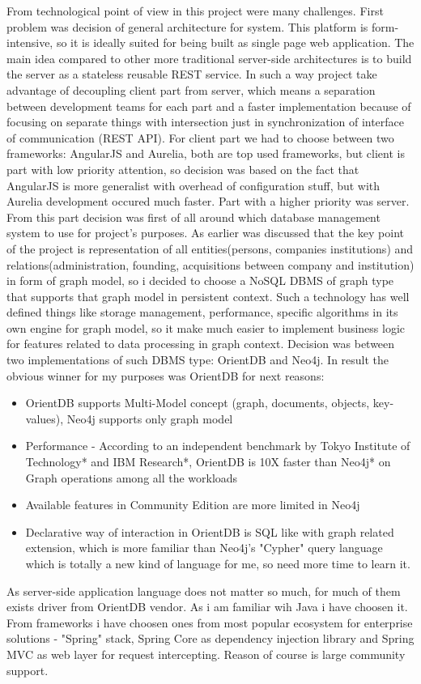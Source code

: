 \documentclass[12pt,a4paper,titlepage]{article}
\begin{document}
	
	From technological point of view in this project were many challenges. First problem was decision of general architecture for system. This platform is form-intensive, so it is ideally suited for being built as single page web application. The main idea compared to other more traditional server-side architectures is to build the server as a stateless reusable REST service. In such a way project take advantage of decoupling client part from server, which means a separation between development teams for each part and a faster implementation because of focusing on separate things with intersection just in synchronization of interface of communication (REST API). For client part we had to choose between two frameworks: AngularJS and Aurelia, both are top used frameworks, but client is part with low priority attention, so decision was based on the fact that AngularJS is more generalist with overhead of configuration stuff, but with Aurelia development occured much faster. Part with a higher priority was server. From this part decision was first of all around which database management system to use for project's purposes. As earlier was discussed that the key point of the project is representation of all entities(persons, companies institutions) and relations(administration, founding, acquisitions between company and institution) in form of graph model, so i decided to choose a NoSQL DBMS of graph type that supports that graph model in persistent context. Such a technology has well defined things like storage management, performance, specific algorithms in its own engine for graph model, so it make much easier to implement business logic for features related to data processing in graph context. Decision was between two implementations of such DBMS type: OrientDB and Neo4j. In result the obvious winner for my purposes was OrientDB for next reasons:
\begin{itemize}
\item OrientDB supports Multi-Model concept (graph, documents, objects, key-values), Neo4j supports only graph model
\item Performance - According to an independent benchmark by Tokyo Institute of Technology* and IBM Research*, OrientDB is 10X faster than Neo4j* on Graph operations among all the workloads
\item Available features in Community Edition are more limited in Neo4j
\item Declarative way of interaction in OrientDB is SQL like with graph related extension, which is more familiar than Neo4j's "Cypher" query language which is totally a new kind of language for me, so need more time to learn it.
\end{itemize}	 
As server-side application language does not matter so much, for much of them exists driver from OrientDB vendor. As i am familiar wih Java i have choosen it. From frameworks i have choosen ones from most popular ecosystem for enterprise solutions - "Spring" stack, Spring Core as dependency injection library and Spring MVC as web layer for request intercepting. Reason of course is large community support.
\end{document}
